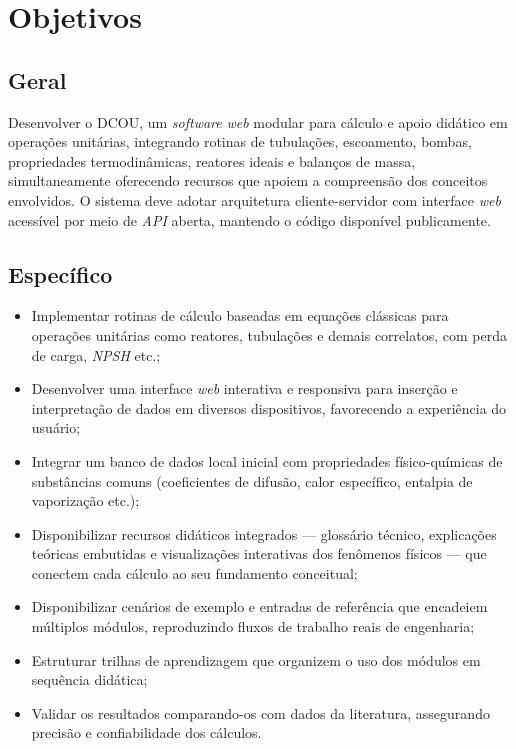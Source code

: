 \chapter{Objetivos}

\section{Geral}

Desenvolver o DCOU, um \textit{software} \textit{web} modular para cálculo e apoio didático em operações unitárias, integrando rotinas de tubulações, escoamento, bombas, propriedades termodinâmicas, reatores ideais e balanços de massa, simultaneamente oferecendo recursos que apoiem a compreensão dos conceitos envolvidos. O sistema deve adotar arquitetura cliente-servidor com interface \textit{web} acessível por meio de \textit{API} aberta, mantendo o código disponível publicamente.

\section{Específico}

\begin{itemize}
    \item Implementar rotinas de cálculo baseadas em equações clássicas para operações unitárias como reatores, tubulações e demais correlatos, com perda de carga, \textit{NPSH} etc.;
    \item Desenvolver uma interface \textit{web} interativa e responsiva para inserção e interpretação de dados em diversos dispositivos, favorecendo a experiência do usuário;
    \item Integrar um banco de dados local inicial com propriedades físico-químicas de substâncias comuns (coeficientes de difusão, calor específico, entalpia de vaporização etc.);
    \item Disponibilizar recursos didáticos integrados --- glossário técnico, explicações teóricas embutidas e visualizações interativas dos fenômenos físicos --- que conectem cada cálculo ao seu fundamento conceitual;
    \item Disponibilizar cenários de exemplo e entradas de referência que encadeiem múltiplos módulos, reproduzindo fluxos de trabalho reais de engenharia;
    \item Estruturar trilhas de aprendizagem que organizem o uso dos módulos em sequência didática;
    \item Validar os resultados comparando-os com dados da literatura, assegurando precisão e confiabilidade dos cálculos.
\end{itemize}
